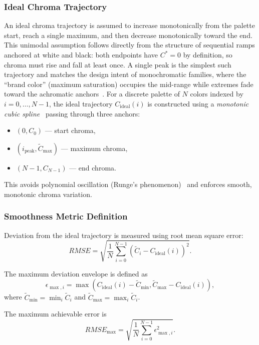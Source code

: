 \subsubsection{Ideal Chroma Trajectory}

An ideal chroma trajectory is assumed to increase monotonically from the palette start,
reach a single maximum, and then decrease monotonically toward the end.
This unimodal assumption follows directly from the structure of
sequential ramps anchored at white and black: both endpoints have
$C^* = 0$ by definition, so chroma must rise and fall at least once.
A single peak is the simplest such trajectory and matches the
design intent of monochromatic families, where the ``brand color''
(maximum saturation) occupies the mid-range while extremes fade
toward the achromatic anchors~\cite{zeileis2009}.
For a discrete palette of $N$ colors indexed by $i = 0,\dots,N-1$, the ideal trajectory
$C_{\mathrm{ideal}}(i)$ is constructed using a \emph{monotonic cubic spline}~\cite{fritsch1980}
passing through three anchors:
\begin{itemize}
\item $(0, C_0)$ — start chroma,
\item $(i_{\mathrm{peak}}, \tilde C_{\max})$ — maximum chroma,
\item $(N-1, C_{N-1})$ — end chroma.
\end{itemize}
This avoids polynomial oscillation (Runge’s phenomenon)~\cite{epperson1987} and enforces smooth,
monotonic chroma variation.

\subsubsection{Smoothness Metric Definition}

Deviation from the ideal trajectory is measured using root mean square error:
\begin{equation}
RMSE =
\sqrt{
\frac{1}{N}
\sum_{i=0}^{N-1}
\left(\tilde C_i - C_{\mathrm{ideal}}(i)\right)^2
}.
\end{equation}

The maximum deviation envelope is defined as
\begin{equation}
\epsilon_{\max,i}
=
\max\!\left(
C_{\mathrm{ideal}}(i) - \tilde C_{\min},
\tilde C_{\max} - C_{\mathrm{ideal}}(i)
\right),
\end{equation}
where
$\tilde C_{\min} = \min_i \tilde C_i$ and
$\tilde C_{\max} = \max_i \tilde C_i$.

The maximum achievable error is
\begin{equation}
RMSE_{\max} =
\sqrt{
\frac{1}{N}
\sum_{i=0}^{N-1}
\epsilon_{\max,i}^2
}.
\end{equation}

